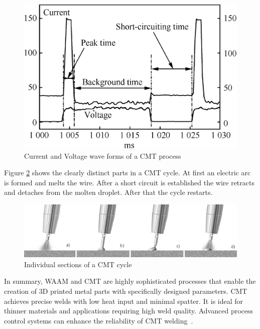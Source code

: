 \begin{figure}[H]
	\centering
	\includegraphics[width=0.6\linewidth]{figures/CMT.jpg}
	\caption{Current and Voltage wave forms of a CMT process~\cite{Selvi.2018}}
	\label{fig:CMT}
\end{figure}


Figure \ref{fig:CMT2} shows the clearly distinct parts in a CMT cycle. At first an electric arc is formed and melts the wire. After a short circuit is established the wire retracts and detaches from the molten droplet. After that the cycle restarts.

\begin{figure}[H]
	\centering
	\includegraphics[width=0.9\linewidth]{figures/CMT2.png}
	\caption{Individual sections of a CMT cycle~\cite{Dalton.28102023}}
	\label{fig:CMT2}
\end{figure}


In summary, WAAM and CMT are highly sophisticated processes that enable the creation of 3D printed metal parts with specifically designed parameters. CMT achieves precise welds with low heat input and minimal spatter. It is ideal for thinner materials and applications requiring high weld quality. Advanced process control systems can enhance the reliability of CMT welding~\cite{Rahul.2018, Pickin.2011}.




